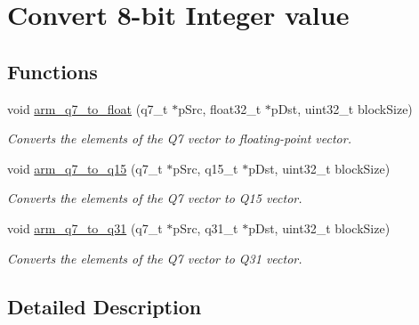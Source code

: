 \hypertarget{group__q7__to__x}{\section{Convert 8-\/bit Integer value}
\label{group__q7__to__x}
}
\subsection*{Functions}
\begin{DoxyCompactItemize}
\item 
void \hyperlink{group__q7__to__x_ga656620f957b65512ed83db03fd455ec5}{arm\-\_\-q7\-\_\-to\-\_\-float} (q7\-\_\-t $\ast$p\-Src, float32\-\_\-t $\ast$p\-Dst, uint32\-\_\-t block\-Size)
\begin{DoxyCompactList}\small\item\em Converts the elements of the Q7 vector to floating-\/point vector. \end{DoxyCompactList}\item 
void \hyperlink{group__q7__to__x_gabc02597fc3f01033daf43ec0547a2f78}{arm\-\_\-q7\-\_\-to\-\_\-q15} (q7\-\_\-t $\ast$p\-Src, q15\-\_\-t $\ast$p\-Dst, uint32\-\_\-t block\-Size)
\begin{DoxyCompactList}\small\item\em Converts the elements of the Q7 vector to Q15 vector. \end{DoxyCompactList}\item 
void \hyperlink{group__q7__to__x_gad8958cd3cb7f521466168b46a25b7908}{arm\-\_\-q7\-\_\-to\-\_\-q31} (q7\-\_\-t $\ast$p\-Src, q31\-\_\-t $\ast$p\-Dst, uint32\-\_\-t block\-Size)
\begin{DoxyCompactList}\small\item\em Converts the elements of the Q7 vector to Q31 vector. \end{DoxyCompactList}\end{DoxyCompactItemize}


\subsection{Detailed Description}



